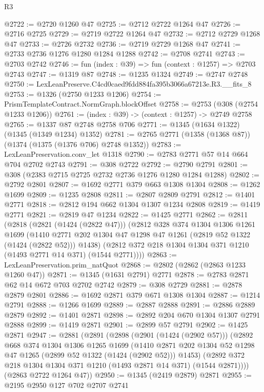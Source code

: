 \begin{lexlean}{R3}
\begin{coremodule}
@2722 := @2720 @1260 @47
@2725 := @2712 @2722 @1264 @47
@2726 := @2716 @2725
@2729 := @2719 @2722 @1264 @47
@2732 := @2712 @2729 @1268 @47
@2733 := @2726 @2732
@2736 := @2719 @2729 @1268 @47
@2741 := @2733 @2736 @1276 @1280 @1284 @1288
@2742 := @2708 @2741
@2743 := @2703 @2742
@2746 := fun (index : @39) => fun (context : @1257) => @2703 @2743
@2747 := @1319 @87
@2748 := @1235 @1324
@2749 := @2747 @2748
@2750 := LexLeanPreserve.C4cd0caed9fdd884fa395b3066a67213e.R3.__fits_8
@2753 := @1326 (@2750 @1233 @1206)
@2754 := PrismTemplateContract.NormGraph.blockOffset
@2758 := @2753 (@308 (@2754 @1233 @1206))
@2761 := (index : @39) -> (context : @1257) -> @2749 @2758
@2765 := @1337 @87 @2748 @2758 @706
@2771 := @1345 (@1634 @1322) (@1345 (@1349 @1234) @1352)
@2781 := @2765 @2771 (@1358 (@1368 @87)) (@1374 (@1375 (@1376 @706) @2748 @1352))
@2783 := LexLeanPreservation.conv_let @1318
@2790 := @2783 @2771 @57 @14 @664 @704 @2702 @2743
@2791 := @308 @2722
@2792 := @2790 @2791
@2801 := @308 (@2383 @2715 @2725 @2732 @2736 @1276 @1280 @1284 @1288)
@2802 := @2792 @2801
@2807 := @1692 @2771 @379 @663 @1308 @1304
@2808 := @1262 @1699
@2809 := @1235 @2808
@2811 := @2807 @2809 @2791
@2812 := @1401 @2771
@2818 := @2812 @194 @662 @1304 @1307 @1234 @2808
@2819 := @1419 @2771
@2821 := @2819 @47 @1234
@2822 := @1425 @2771
@2862 := @2811
    (@2818
      (@2821 (@1424 (@2822 @47)))
      (@2812
        @328
        @374
        @1304
        @1306
        @1261
        @1699
        (@1410 @2771 @202 @1304 @47 @1298 @47 @1261 (@2819 @52 @1322 (@1424 (@2822 @52))) @1438)
        (@2812 @372 @218 @1304 @1304 @371 @1210 (@1493 @2771 @14 @371) (@1544 @2771))))
@2863 := LexLeanPreservation.prim_natQuot
@2868 := @2802 (@2862 (@2863 @1233 @1260 @47))
@2871 := @1345 (@1631 @2791) @2771
@2878 := @2783 @2871 @62 @14 @672 @703 @2702 @2742
@2879 := @308 @2729
@2881 := @2878 @2879 @2801
@2886 := @1692 @2871 @379 @671 @1308 @1304
@2887 := @1214 @2791
@2888 := @1266 @1699
@2889 := @2887 @2888
@2891 := @2886 @2889 @2879
@2892 := @1401 @2871
@2898 := @2892 @204 @670 @1304 @1307 @2791 @2888
@2899 := @1419 @2871
@2901 := @2899 @57 @2791
@2902 := @1425 @2871
@2947 := @2881
    (@2891
      (@2898
        (@2901 (@1424 (@2902 @57)))
        (@2892
          @668
          @374
          @1304
          @1306
          @1265
          @1699
          (@1410 @2871 @202 @1304 @52 @1298 @47 @1265 (@2899 @52 @1322 (@1424 (@2902 @52))) @1453)
          (@2892 @372 @218 @1304 @1304 @371 @1210 (@1493 @2871 @14 @371) (@1544 @2871))))
      (@2863 @2722 @1264 @47))
@2950 := @1345 (@2419 @2879) @2871
@2955 := @2195 @2950 @127 @702 @2707 @2741

\end{coremodule}
\end{lexlean}
